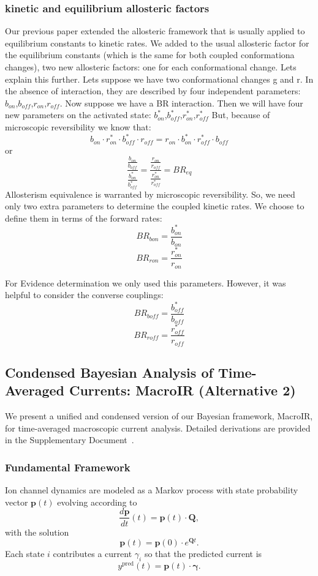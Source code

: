 \documentclass[pdflatex,sn-mathphys-num]{sn-jnl}%
\theoremstyle{thmstyleone}%
\theoremstyle{thmstyletwo}%
\theoremstyle{thmstylethree}%
\begin{document}
\subsubsection{kinetic and equilibrium allosteric factors}
Our previous paper extended the allosteric framework that is usually applied to equilibrium constants to kinetic rates. We added to the usual allosteric factor for the equilibrium constants (which is the same for both coupled conformationa changes), two new allosteric factors: one for each conformational change. 
Lets explain this further. Lets suppose we have two conformational changes g and r. In the absence of interaction, they are described by four independent parameters: $b_{on}$,$b_{off}$,$r_{on}$,$r_{off}$. 
Now suppose we have a BR interaction. Then we will have four new parameters on the activated state: $b^*_{on}$,$b^*_{off}$,$r^*_{on}$,$r^*_{off}$ But, because of microscopic reversibility we know that: 
$$ b_{on} \cdot r^*_{on} \cdot b^*_{off} \cdot r_{off} = r_{on} \cdot b^*_{on} \cdot r^*_{off} \cdot b_{off} $$
or 
$$ \frac {\frac {b_{on}}{b_{off}}}{\frac {b^*_{on}} {b^*_{off}}}     =  \frac {\frac {r_{on}}{r_{off}}}{\frac {r^*_{on}} {r^*_{off}}} =BR_{eq}  $$
Allosterism equivalence is warranted by microscopic reversibility. 
So, we need only two extra parameters to determine the coupled kinetic rates. We choose to define them in terms of the forward rates: 
$$ BR_{b{on}} = \frac{b^*_{on}}{b_{on}}$$
$$ BR_{r{on}} = \frac{r^*_{on}}{r_{on}}$$

For Evidence determination we only used this parameters. However, it was helpful to consider the converse couplings: 
$$ BR_{b{off}} = \frac{b^*_{off}}{b_{off}}$$
$$ BR_{r{off}} = \frac{r^*_{off}}{r_{off}}$$

\subsection{Condensed Bayesian Analysis of Time-Averaged Currents: MacroIR (Alternative 2)}
We present a unified and condensed version of our Bayesian framework, MacroIR, for time-averaged macroscopic current analysis. Detailed derivations are provided in the Supplementary Document~\cite{supplementary}.

\subsubsection{Fundamental Framework}
Ion channel dynamics are modeled as a Markov process with state probability vector \(\boldsymbol{p}(t)\) evolving according to
\begin{equation}
	\frac{d\boldsymbol{p}}{dt}(t) = \boldsymbol{p}(t) \cdot \boldsymbol{Q},
	\label{eq:master_eq_unified}
\end{equation}
with the solution
\begin{equation}
	\boldsymbol{p}(t) = \boldsymbol{p}(0) \cdot e^{\boldsymbol{Q}t}.
	\label{eq:solution_unified}
\end{equation}
Each state \(i\) contributes a current \(\gamma_i\) so that the predicted current is
\begin{equation}
	y^{\text{pred}}(t) = \boldsymbol{p}(t) \cdot \boldsymbol{\gamma}.
	\label{eq:current_unified}
\end{equation}
\end{document}
